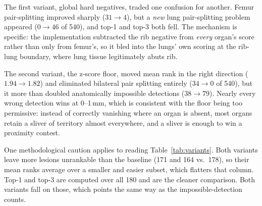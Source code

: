 The first variant, global hard negatives, traded one confusion for another.
Femur pair-splitting improved sharply ($31 \to 4$), but a \emph{new} lung
pair-splitting problem appeared ($0 \to 46$ of 540), and top-1 and top-3 both
fell. The mechanism is specific: the implementation subtracted the rib negative
from \emph{every} organ's score rather than only from femur's, so it bled into
the lungs' own scoring at the rib-lung boundary, where lung tissue legitimately
abuts rib.

The second variant, the z-score floor, moved mean rank in the right direction
($1.94 \to 1.82$) and eliminated bilateral pair splitting entirely
($34 \to 0$ of 540), but it more than doubled anatomically impossible detections
($38 \to 79$). Nearly every wrong
detection wins at 0--1\,mm, which is consistent with the floor being too
permissive: instead of correctly vanishing where an organ is absent, most organs
retain a sliver of territory almost everywhere, and a sliver is enough to win a
proximity contest.

One methodological caution applies to reading Table~\ref{tab:variants}. Both
variants leave more lesions unrankable than the baseline (171 and 164 vs.\ 178),
so their mean ranks average over a smaller and easier subset, which flatters
that column. Top-1 and top-3 are computed over all 180 and are the cleaner
comparison. Both variants fall on those, which points the same way as the
impossible-detection counts.
